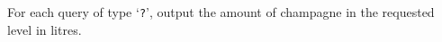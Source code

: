 
For each query of type `\texttt{?}', output the amount of champagne in the requested level in litres.
